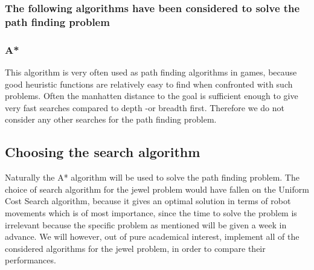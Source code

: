 \subsubsection*{The following algorithms have been considered to solve the path finding problem}
\subsubsection*{A*}
This algorithm is very often used as path finding algorithms in games, because good heuristic functions are relatively easy to find when confronted with such problems. Often the manhatten distance to the goal is sufficient enough to give very fast searches compared to depth -or breadth first. Therefore we do not consider any other searches for the path finding problem.

\subsection{Choosing the search algorithm}
Naturally the A* algorithm will be used to solve the path finding problem. The choice of search algorithm for the jewel problem would have fallen on the Uniform Cost Search algorithm, because it gives an optimal solution in terms of robot movements which is of most importance, since the time to solve the problem is irrelevant because the specific problem as mentioned will be given a week in advance. We will however, out of pure academical interest, implement all of the considered algorithms for the jewel problem, in order to compare their performances. 